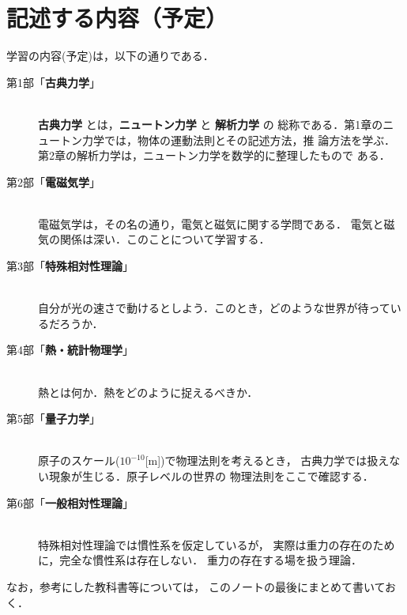 ﻿\section*{記述する内容（予定）}

学習の内容(予定)は，以下の通りである．
\begin{center}
\begin{description}
    \item[第1部「{\bf 古典力学}」] \mbox{} \\
        \textbf{古典力学} とは，\textbf{ニュートン力学} と \textbf{解析力学} の
        総称である．第1章のニュートン力学では，物体の運動法則とその記述方法，推
        論方法を学ぶ．第2章の解析力学は，ニュートン力学を数学的に整理したもので
        ある．

    \item[第2部「{\bf 電磁気学}」] \mbox{} \\
        電磁気学は，その名の通り，電気と磁気に関する学問である．
        電気と磁気の関係は深い．このことについて学習する．

    \item[第3部「{\bf 特殊相対性理論}」] \mbox{} \\
        自分が光の速さで動けるとしよう．このとき，どのような世界が待っているだろうか．

    \item[第4部「{\bf 熱・統計物理学}」] \mbox{} \\
        熱とは何か．熱をどのように捉えるべきか．

    \item[第5部「{\bf 量子力学}」] \mbox{} \\
        原子のスケール($10^{-10}$[m])で物理法則を考えるとき，
        古典力学では扱えない現象が生じる．原子レベルの世界の
        物理法則をここで確認する．

    \item[第6部「{\bf 一般相対性理論}」] \mbox{} \\
        特殊相対性理論では慣性系を仮定しているが，
        実際は重力の存在のために，完全な慣性系は存在しない．
        重力の存在する場を扱う理論．

\end{description}
\end{center}

なお，参考にした教科書等については，
このノートの最後にまとめて書いておく．

